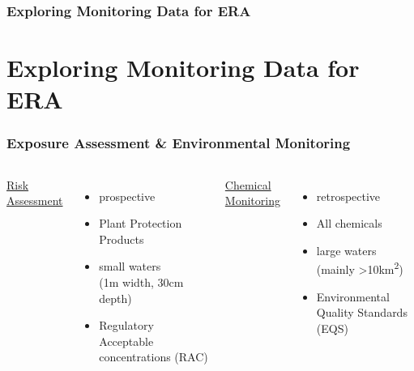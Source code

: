 \documentclass[
	10pt
	]{beamer}
\begin{document}
\begin{frame}
\frametitle{Exploring Monitoring Data for ERA}
 \resizebox{11.5cm}{!}{%
				
				}
\end{frame}



\section{Exploring Monitoring Data for ERA}


{%
\begin{frame}
\frametitle{Exposure Assessment \& Environmental Monitoring}
	\begin{columns}
	    	\underline{Risk Assessment}
	    	\begin{itemize}
	    		\item<1-> prospective
	    		\item<2-> Plant Protection Products
	    		\item<3-> small waters \\ (1m width, 30cm depth)
	    		\item<4-> Regulatory Acceptable concentrations (RAC)
	    	\end{itemize}
	    	\underline{Chemical Monitoring}
	    	\begin{itemize}
	    		\item<1-> retrospective
	    		\item<2-> All chemicals
	    		\item<3-> large waters \\ (mainly \textgreater10km\textsuperscript{2})
	    		\item<4-> Environmental Quality Standards (EQS)
	    	\end{itemize}
	\end{columns}
\end{frame}
}
\end{document}
